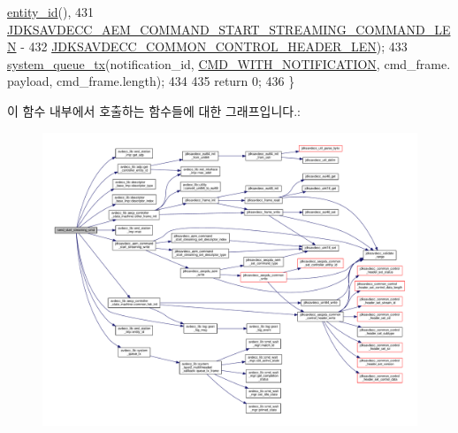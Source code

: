 \begin{DoxyCode}
      \hyperlink{classavdecc__lib_1_1end__station__imp_a363b6c9664a0d701def9b17863e20ad3}{entity\_id}(),
431                                                        
      \hyperlink{group__command__start__streaming_ga64b3f37bb8a2701b0fa5255a96302231}{JDKSAVDECC\_AEM\_COMMAND\_START\_STREAMING\_COMMAND\_LEN} -
432                                                            
      \hyperlink{group__jdksavdecc__avtp__common__control__header_gaae84052886fb1bb42f3bc5f85b741dff}{JDKSAVDECC\_COMMON\_CONTROL\_HEADER\_LEN});
433     \hyperlink{namespaceavdecc__lib_a6dd511685627c0865a3442b539a4e8e9}{system\_queue\_tx}(notification\_id, \hyperlink{namespaceavdecc__lib_aabcadff06aa62be0ce47bc0646823604aba48b8a017e06fb240b650cdea965178}{CMD\_WITH\_NOTIFICATION}, cmd\_frame.
      payload, cmd\_frame.length);
434 
435     \textcolor{keywordflow}{return} 0;
436 \}
\end{DoxyCode}


이 함수 내부에서 호출하는 함수들에 대한 그래프입니다.\+:
\nopagebreak
\begin{figure}[H]
\begin{center}
\leavevmode
\includegraphics[width=350pt]{classavdecc__lib_1_1stream__output__descriptor__imp_a928dd8b641c5c6ed158ae15ad7ad3043_cgraph}
\end{center}
\end{figure}


